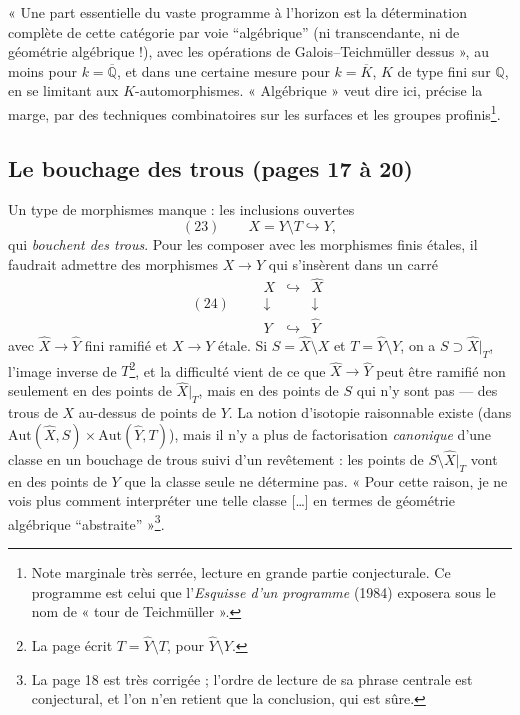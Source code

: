 \documentclass[11pt,a4paper]{article}
\begin{document}
« Une part essentielle du vaste programme à l'horizon est la détermination
complète de cette catégorie par voie “algébrique” (ni transcendante, ni de
géométrie algébrique !), avec les opérations de Galois–Teichmüller dessus »,
au moins pour $k = \overline{\mathbb{Q}}$, et dans une certaine mesure pour
$k = \overline{K}$, $K$ de type fini sur $\mathbb{Q}$, en se limitant aux
$K$-automorphismes. « Algébrique » veut dire ici, précise la marge, par des
techniques combinatoires sur les surfaces et les groupes
profinis\footnote{Note marginale très serrée, lecture en grande partie
conjecturale. Ce programme est celui que l'\emph{Esquisse d'un programme}
(1984) exposera sous le nom de « tour de Teichmüller ».}.

\subsection*{Le bouchage des trous (pages 17 à 20)}

Un type de morphismes manque : les inclusions ouvertes
\[
(23)\qquad X = Y \setminus T \hookrightarrow Y ,
\]
qui \emph{bouchent des trous}. Pour les composer avec les morphismes finis
étales, il faudrait admettre des morphismes $X \to Y$ qui s'insèrent dans un
carré
\[
(24)\qquad
\begin{array}{ccc}
X & \hookrightarrow & \widehat{X}\\
\downarrow & & \downarrow\\
Y & \hookrightarrow & \widehat{Y}
\end{array}
\]
avec $\widehat{X} \to \widehat{Y}$ fini ramifié et $X \to Y$ étale. Si $S =
\widehat{X} \setminus X$ et $T = \widehat{Y} \setminus Y$, on a
$S \supset \widehat{X}|_T$, l'image inverse de $T$\footnote{La page écrit
$T = \widehat{Y} \setminus T$, pour $\widehat{Y} \setminus Y$.}, et la
difficulté vient de ce que $\widehat{X} \to \widehat{Y}$ peut être ramifié non
seulement en des points de $\widehat{X}|_T$, mais en des points de $S$ qui
n'y sont pas — des trous de $X$ au-dessus de points de $Y$. La notion
d'isotopie raisonnable existe (dans $\mathrm{Aut}(\widehat{X}, S) \times
\mathrm{Aut}(\widehat{Y}, T)$), mais il n'y a plus de factorisation
\emph{canonique} d'une classe en un bouchage de trous suivi d'un revêtement :
les points de $S \setminus \widehat{X}|_T$ vont en des points de $Y$ que la
classe seule ne détermine pas. « Pour cette raison, je ne vois plus comment
interpréter une telle classe […] en termes de géométrie algébrique
“abstraite” »\footnote{La page 18 est très corrigée ; l'ordre de lecture de
sa phrase centrale est conjectural, et l'on n'en retient que la conclusion,
qui est sûre.}.
\end{document}
